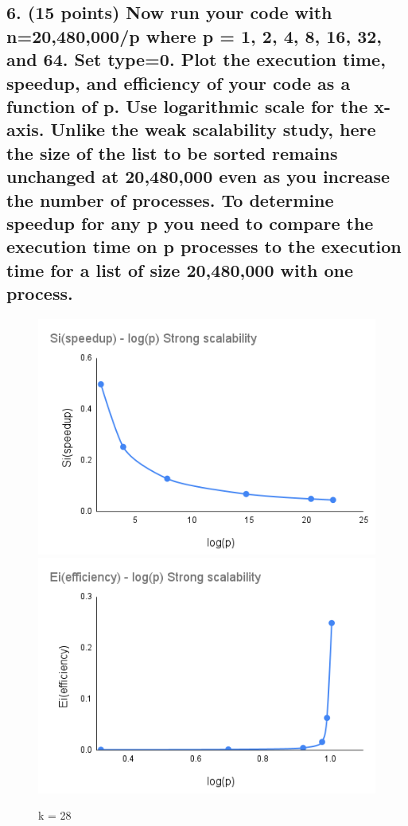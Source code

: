 \documentclass[pstricks,border=14pt,14pt]{article}
\begin{document}
\subsection*{6. (15 points) Now run your code with n=20,480,000/p where p = 1, 2, 4, 8, 16, 32, and 64. Set type=0. Plot the execution time, speedup, and efficiency of your code as a function of p. Use logarithmic scale for the x-axis.
Unlike the weak scalability study, here the size of the list to be sorted remains unchanged at 20,480,000 even as you increase the number of processes. To determine speedup for any p you need to compare the execution time on p processes to the execution time for a list of size 20,480,000 with one process.}
\begin{figure}[H]
    \centering
    \includegraphics[width=12cm]{Strong_scalability_Si_logP.png}
    \includegraphics[width=12cm]{Strong_scalability_Ei_logP.png}
    \caption{k = 28}
    \label{fig:my_label}
\end{figure}
\newpage
\end{document}
